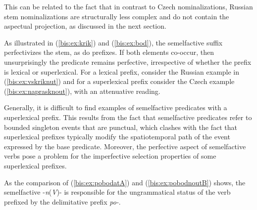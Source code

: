 \documentclass[output=paper]{langscibook}
\begin{document}
\z

\noindent This can be related to the fact that in contrast to Czech nominalizations, Russian stem nominalizations are structurally less complex and do not contain the aspectual projection, as discussed in the next section. 			

As illustrated in (\ref{bis:ex:krik}) and (\ref{bis:ex:bod}), the semelfactive suffix perfectivizes the stem, as do prefixes. If both elements co-occur, then unsurprisingly the predicate remains perfective, irrespective of whether the prefix is lexical or superlexical. For a lexical prefix, consider the Russian example in (\ref{bis:ex:vskriknut}) and for a superlexical prefix consider the Czech example (\ref{bis:ex:naprasknout}), with an attenuative reading.

\z

\noindent Generally, it is difficult to find examples of semelfactive predicates with a superlexical prefix. This results from the fact that semelfactive predicates refer to bounded singleton events that are punctual, which clashes with the fact that superlexical prefixes typically modify the spatiotemporal path of the event expressed by the base predicate. Moreover, the perfective aspect of semelfactive verbs pose a problem for the imperfective selection properties of some superlexical prefixes.

As the comparison of (\ref{bis:ex:pobodatA}) and (\ref{bis:ex:pobodnoutB}) shows, the semelfactive -\textit{n}(\textit{V})- is responsible for the ungrammatical status of the verb prefixed by the delimitative prefix \textit{po-}.
\end{document}
